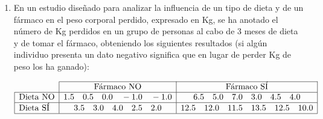 \begin{enumerate}[leftmargin=*]
\begin{enumerate}


\item Teniendo en cuenta que no hay interacción significativa, calcular el intervalo de confianza para la diferencia de
medias en los kg perdidos según la variable dieta e igualmente con la variable fármaco.
\begin{indicacion}{
\begin{enumerate}
\item Seleccionar el menú \texttt{Teaching\flecha Tests paramétricos\flecha Medias\flecha ANOVA}.
\item En el cuadro de diálogo que aparece, seleccionar el conjunto de datos .
\item Seleccionar la variable  como  y las variables  y  en el campo .
\item En la solapa  seleccionar la opción  y hacer
click sobre el botón .
\end{enumerate}
}
\end{indicacion}
\end{enumerate}


\item En un estudio diseñado para analizar la influencia de un tipo de dieta y de un fármaco en el peso corporal
perdido, expresado en Kg, se ha anotado el número de Kg perdidos en un grupo de personas al cabo de 3 meses de dieta y
de tomar el fármaco, obteniendo los siguientes resultados (si algún individuo presenta un dato negativo significa que en
lugar de perder Kg de peso los ha ganado):

\[
\begin{array}{|l|c|c|}
\cline{2-3}
\multicolumn{1}{l|}{} & \text{Fármaco NO} & \text{Fármaco SÍ} \\
\hline
\text{Dieta NO} & 1.5\quad 0.5\quad 0.0\quad -1.0\quad -1.0 & 6.5\quad 5.0\quad 7.0\quad 3.0\quad 4.5\quad 4.0 \\
\hline
\text{Dieta SÍ} & 3.5\quad 3.0\quad 4.0\quad 2.5\quad 2.0 & 12.5\quad 12.0\quad 11.5\quad 13.5\quad 12.5\quad 10.0 \\
\hline
\end{array}
\]


\end{enumerate}
